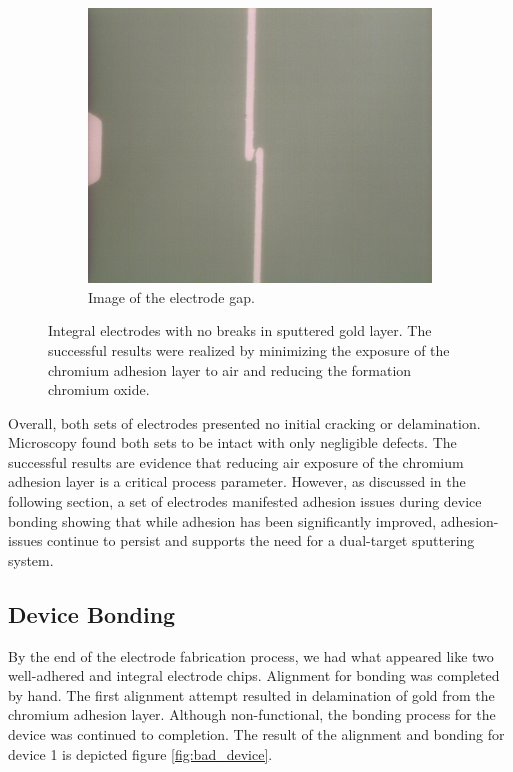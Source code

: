 \begin{figure}[h]
\begin{subfigure}[b]{0.45\textwidth}
        \includegraphics[width=\textwidth]{images/goodElectrodeCloseUp.png}
        \caption{Image of the electrode gap.}
    \end{subfigure}
    \caption[Integral electrodes.]{Integral electrodes with no breaks in sputtered gold layer. The successful results were realized by minimizing the exposure of the chromium adhesion layer to air and reducing the formation chromium oxide.}
    \label{fig:good_electrodes}
\end{figure}

\FloatBarrier

\par Overall, both sets of electrodes presented no initial cracking or delamination. Microscopy found both sets to be intact with only negligible defects. The successful results are evidence that reducing air exposure of the chromium adhesion layer is a critical process parameter. However, as discussed in the following section, a set of electrodes manifested adhesion issues during device bonding showing that while adhesion has been significantly improved, adhesion-issues continue to persist and supports the need for a dual-target sputtering system.

\FloatBarrier

\subsection{Device Bonding}

\par By the end of the electrode fabrication process, we had what appeared like two well-adhered and integral electrode chips. Alignment for bonding was completed by hand. The first alignment attempt resulted in delamination of gold from the chromium adhesion layer. Although non-functional, the bonding process for the device was continued to completion. The result of the alignment and bonding for device 1 is depicted figure \ref{fig:bad_device}.

